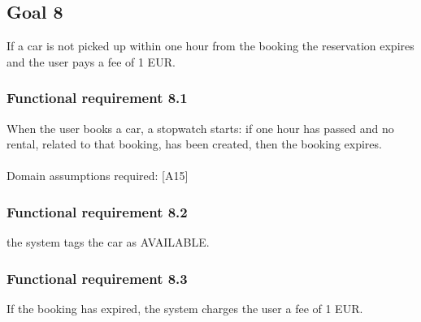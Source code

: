 \subsection{Goal 8}
If a car is not picked up within one hour from the booking the reservation expires and the user pays a fee of 1 EUR.

\setcounter{secnumdepth}{3}
\subsubsection{Functional requirement 8.1}
When the user books a car, a stopwatch starts: if one hour has passed and no rental, related to that booking, has been created, then the booking expires.\\~\\
\noindent Domain assumptions required: [A15]

\subsubsection{Functional requirement 8.2}
 the system tags the car as AVAILABLE.

\subsubsection{Functional requirement 8.3}
 If the booking has expired, the system charges the user a fee of 1 EUR.